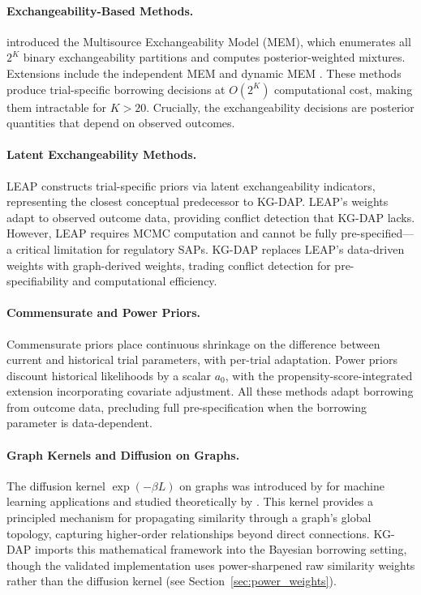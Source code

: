 \documentclass[12pt]{article}
\begin{document}
\paragraph{Exchangeability-Based Methods.}
\citet{kaizer2018bayesian} introduced the Multisource Exchangeability Model (MEM), which enumerates all $2^K$ binary exchangeability partitions and computes posterior-weighted mixtures. Extensions include the independent MEM \citep[iMEM;][]{kaizer2021bayesian} and dynamic MEM \citep[dMEM;][]{ji2022dynamic}. These methods produce trial-specific borrowing decisions at $O(2^K)$ computational cost, making them intractable for $K > 20$. Crucially, the exchangeability decisions are posterior quantities that depend on observed outcomes.

\paragraph{Latent Exchangeability Methods.}
LEAP \citep{alt2024leap} constructs trial-specific priors via latent exchangeability indicators, representing the closest conceptual predecessor to KG-DAP. LEAP's weights adapt to observed outcome data, providing conflict detection that KG-DAP lacks. However, LEAP requires MCMC computation and cannot be fully pre-specified---a critical limitation for regulatory SAPs. KG-DAP replaces LEAP's data-driven weights with graph-derived weights, trading conflict detection for pre-specifiability and computational efficiency.

\paragraph{Commensurate and Power Priors.}
Commensurate priors \citep{hobbs2011hierarchical} place continuous shrinkage on the difference between current and historical trial parameters, with per-trial adaptation. Power priors \citep{ibrahim2000power} discount historical likelihoods by a scalar $a_0$, with the propensity-score-integrated extension \citep{wang2020propensity} incorporating covariate adjustment. All these methods adapt borrowing from outcome data, precluding full pre-specification when the borrowing parameter is data-dependent.

\paragraph{Graph Kernels and Diffusion on Graphs.}
The diffusion kernel $\exp(-\beta L)$ on graphs was introduced by \citet{kondor2002diffusion} for machine learning applications and studied theoretically by \citet{smola2003kernels}. This kernel provides a principled mechanism for propagating similarity through a graph's global topology, capturing higher-order relationships beyond direct connections. KG-DAP imports this mathematical framework into the Bayesian borrowing setting, though the validated implementation uses power-sharpened raw similarity weights rather than the diffusion kernel (see Section~\ref{sec:power_weights}).
\end{document}

